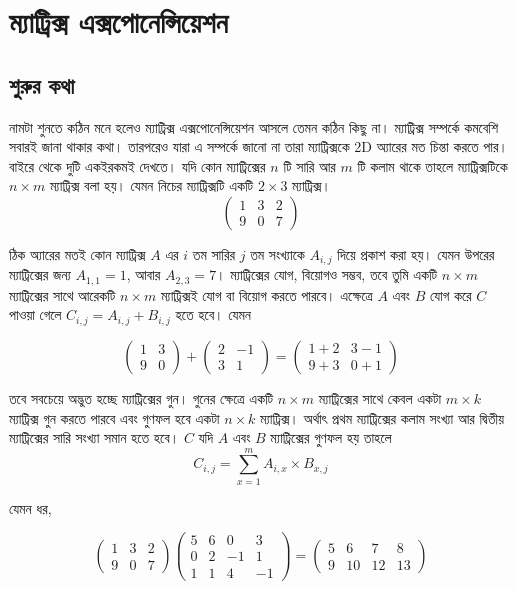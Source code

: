 \chapter{ম্যাট্রিক্স এক্সপোনেন্সিয়েশন}

\section{শুরুর কথা}

নামটা শুনতে কঠিন মনে হলেও ম্যাট্রিক্স এক্সপোনেন্সিয়েশন আসলে তেমন কঠিন কিছু না। ম্যাট্রিক্স সম্পর্কে কমবেশি সবারই জানা থাকার কথা। তারপরেও যারা এ সম্পর্কে জানো না তারা ম্যাট্রিক্সকে 2D অ্যারের মত চিন্তা করতে পার। বাইরে থেকে দুটি একইরকমই দেখতে। যদি কোন ম্যাট্রিক্সের $n$ টি সারি আর $m$ টি কলাম থাকে তাহলে ম্যাট্রিক্সটিকে $n \times m$ ম্যাট্রিক্স বলা হয়। যেমন নিচের ম্যাট্রিক্সটি একটি $2 \times 3$ ম্যাট্রিক্স।
$$
\begin{pmatrix}
1 & 3 & 2\\
9 & 0 & 7
\end{pmatrix}
$$

ঠিক অ্যারের মতই কোন ম্যাট্রিক্স $A$ এর $i$ তম সারির $j$ তম সংখ্যাকে $A_{i, j}$ দিয়ে প্রকাশ করা হয়। যেমন উপরের ম্যাট্রিক্সের জন্য $A_{1, 1} = 1$, আবার $A_{2, 3} = 7$। ম্যাট্রিক্সের যোগ, বিয়োগও সম্ভব, তবে তুমি একটি $n \times m$ ম্যাট্রিক্সের সাথে আরেকটি $n \times m$ ম্যাট্রিক্সই যোগ বা বিয়োগ করতে পারবে। এক্ষেত্রে $A$ এবং  $B$ যোগ করে $C$ পাওয়া গেলে $C_{i, j} = A_{i, j} + B_{i, j}$ হতে হবে। যেমন

$$
\begin{pmatrix}
1 & 3\\
9 & 0
\end{pmatrix}
+ 
\begin{pmatrix}
2 & -1\\
3 & 1
\end{pmatrix}
=
\begin{pmatrix}
1 + 2 & 3 - 1\\
9 + 3 & 0 + 1
\end{pmatrix}
$$

তবে সবচেয়ে অদ্ভুত হচ্ছে ম্যাট্রিক্সের গুন। গুনের ক্ষেত্রে একটি $n \times m$ ম্যাট্রিক্সের সাথে কেবল একটা $m \times k$ ম্যাট্রিক্স গুন করতে পারবে এবং  গুণফল হবে একটা $n \times k$ ম্যাট্রিক্স। অর্থাৎ প্রথম ম্যাট্রিক্সের কলাম সংখ্যা আর দ্বিতীয় ম্যাট্রিক্সের সারি সংখ্যা সমান হতে হবে। $C$ যদি $A$ এবং $B$ ম্যাট্রিক্সের গুণফল হয় তাহলে 
$$ C_{i, j} = \sum_{x = 1}^{m} A_{i, x} \times B_{x, j}$$

যেমন ধর, 

$$
\begin{pmatrix}
1 & 3 & 2\\
9 & 0 & 7
\end{pmatrix}
\begin{pmatrix}
5 & 6 & 0 & 3 \\
0 & 2 & -1 & 1\\
1 & 1 & 4 & -1
\end{pmatrix} = 
\begin{pmatrix}
5 & 6 & 7 & 8\\
9 & 10 & 12 & 13
\end{pmatrix}
$$

